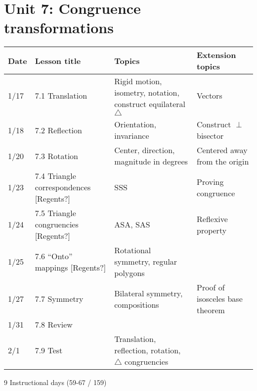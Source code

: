 \section*{Unit 7: Congruence transformations}
\begin{tabular}{|p{0.9cm}|p{4cm}|p{7cm}|p{5cm}|}
  \hline
  Date & Lesson title & Topics  & Extension topics \\
  \hline
  1/17 & 7.1 Translation & Rigid motion, isometry, notation, construct equilateral $\triangle$ & Vectors \\
  \hline
  1/18 & 7.2 Reflection & Orientation, invariance & Construct $\perp$ bisector \\
  \hline
  1/20 & 7.3 Rotation & Center, direction, magnitude in degrees & Centered away from the origin \\
  \hline
  1/23 & 7.4 Triangle correspondences [Regents?] & SSS & Proving congruence \\
  \hline
  1/24 & 7.5 Triangle congruencies [Regents?] & ASA, SAS & Reflexive property \\
  \hline
  1/25 & 7.6 ``Onto'' mappings [Regents?] & Rotational symmetry, regular polygons & \\
  \hline
  1/27 & 7.7 Symmetry & Bilateral symmetry, compositions & Proof of isosceles base theorem \\
  \hline
  1/31 & 7.8 Review &  &  \\
  \hline
  2/1 & 7.9 Test & Translation, reflection, rotation, $\triangle$ congruencies &  \\
  \hline

\end{tabular} \par \vspace*{0.3cm}
9 Instructional days (59-67 / 159)


